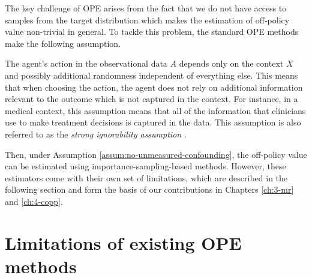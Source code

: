 The key challenge of OPE arises from the fact that we do not
have access to samples from the target distribution which makes the estimation of off-policy value non-trivial in general.
To tackle this problem, the standard OPE methods make the following assumption.

\begin{assumption}\label{assum:no-unmeasured-confounding}
    The agent's action in the observational data $A$ depends only on the context $X$ and possibly additional randomness independent of everything else. This means that when choosing the action, the agent does not rely on additional information relevant to the outcome which is not captured in the context. For instance, in a medical context, this assumption means that all of the information that clinicians use to make treatment decisions is captured in the data. This assumption is also referred to as the \emph{strong ignorability assumption} \citep{tsiatis2019dynamic}.
\end{assumption}

Then, under Assumption \ref{assum:no-unmeasured-confounding}, the off-policy value can be estimated using importance-sampling-based methods. 
However, these estimators come with their own set of limitations, which are described in the following section and form the basis of our contributions in Chapters \ref*{ch:3-mr} and \ref*{ch:4-copp}.

\section{Limitations of existing OPE methods}

